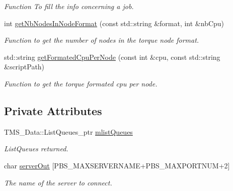 \begin{DoxyCompactItemize}
\begin{DoxyCompactList}\small\item\em Function To fill the info concerning a job. \item\end{DoxyCompactList}\item 
int \hyperlink{classTorqueServer_a3abd12ff06eb1774669d03b3f6f85f22}{getNbNodesInNodeFormat} (const std::string \&format, int \&nbCpu)
\begin{DoxyCompactList}\small\item\em Function to get the number of nodes in the torque node format. \item\end{DoxyCompactList}\item 
std::string \hyperlink{classTorqueServer_aa43c09a2a522df515a6b0b4334ed96d8}{getFormatedCpuPerNode} (const int \&cpu, const std::string \&scriptPath)
\begin{DoxyCompactList}\small\item\em Function to get the torque formated cpu per node. \item\end{DoxyCompactList}\end{DoxyCompactItemize}
\subsection*{Private Attributes}
\begin{DoxyCompactItemize}
\item 
\hypertarget{classTorqueServer_ada6a31f5672ecf7297dfac26ed62e19a}{
TMS\_\-Data::ListQueues\_\-ptr \hyperlink{classTorqueServer_ada6a31f5672ecf7297dfac26ed62e19a}{mlistQueues}}
\label{classTorqueServer_ada6a31f5672ecf7297dfac26ed62e19a}

\begin{DoxyCompactList}\small\item\em ListQueues returned. \item\end{DoxyCompactList}\item 
\hypertarget{classTorqueServer_ae798d6ea4f01fc4336756a0cba5a644c}{
char \hyperlink{classTorqueServer_ae798d6ea4f01fc4336756a0cba5a644c}{serverOut} \mbox{[}PBS\_\-MAXSERVERNAME+PBS\_\-MAXPORTNUM+2\mbox{]}}
\label{classTorqueServer_ae798d6ea4f01fc4336756a0cba5a644c}

\begin{DoxyCompactList}\small\item\em The name of the server to connect. \item\end{DoxyCompactList}\end{DoxyCompactItemize}


